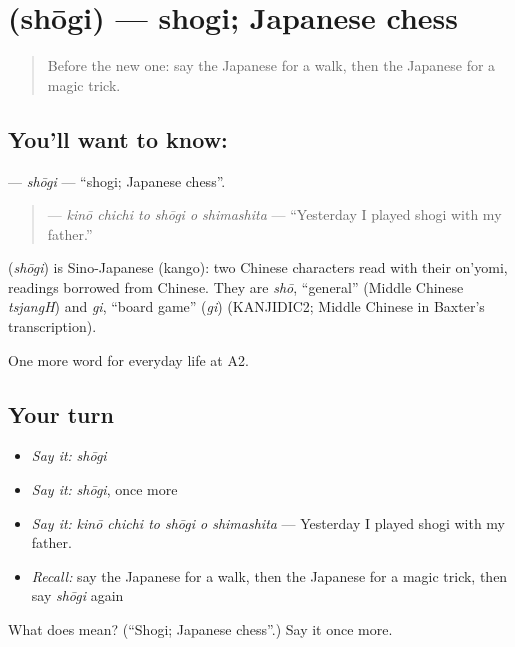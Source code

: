 \section[\texorpdfstring{\ja{しょうぎ} (shōgi)}{しょうぎ (shōgi)}]{ (shōgi) — shogi; Japanese chess}

\label{lesson:JA-C239-shougi}



\begin{quote}
Before the new one: say the Japanese for a walk, then the Japanese for a magic trick.
\end{quote}

\subsection*{You'll want to know: }
\textbf{} — \emph{shōgi} — \textquotedblleft{}shogi; Japanese chess\textquotedblright{}.

\begin{quote}
\textbf{   } — \emph{kinō chichi to shōgi o shimashita} — \textquotedblleft{}Yesterday I played shogi with my father.\textquotedblright{}
\end{quote}

\begin{cousinweb}
\textbf{} (\emph{shōgi}) is Sino-Japanese (kango): two Chinese characters read with their on'yomi, readings borrowed from Chinese. They are \emph{shō}, \textquotedblleft{}general\textquotedblright{} (Middle Chinese \emph{tsjangH}) and \emph{gi}, \textquotedblleft{}board game\textquotedblright{} (\emph{gi}) (KANJIDIC2; Middle Chinese in Baxter's transcription).
\end{cousinweb}

\begin{grammarlens}[title={What you've built}]
One more word for everyday life at A2.
\end{grammarlens}

\subsection*{Your turn}
\begin{itemize}
\raggedright
  \item \emph{Say it:} \emph{shōgi}
  \item \emph{Say it:} \emph{shōgi}, once more
  \item \emph{Say it:} \emph{kinō chichi to shōgi o shimashita} — Yesterday I played shogi with my father.
  \item \emph{Recall:} say the Japanese for a walk, then the Japanese for a magic trick, then say \emph{shōgi} again
\end{itemize}

\begin{tcolorbox}[breakable,colback=teal!4,colframe=teal!35!black,title={Before you move on}]
What does  mean? (\textquotedblleft{}Shogi; Japanese chess\textquotedblright{}.) Say it once more.
\end{tcolorbox}
